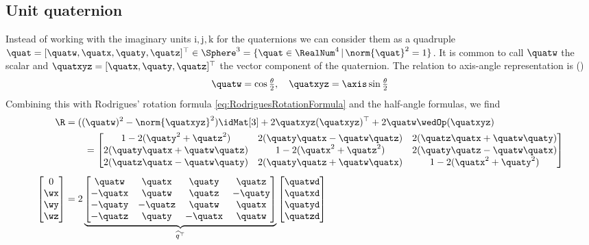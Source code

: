 \subsection{Unit quaternion}
Instead of working with the imaginary units $\mathrm{i}, \mathrm{j}, \mathrm{k}$ for the quaternions we can consider them as a quadruple $\quat = [\quatw, \quatx, \quaty, \quatz]^\top \in \Sphere^3 = \{ \quat \in \RealNum^4 \, | \, \norm{\quat}^2 = 1 \}$.
It is common to call $\quatw$ the scalar and $\quatxyz=[\quatx, \quaty, \quatz]^\top$ the vector component of the quaternion.
The relation to axis-angle representation is (\eg \cite[sec.\ 2.3]{Murray:Robotic})
\begin{align}
 \quatw = \cos\tfrac{\theta}{2}, \quad \quatxyz = \axis \sin\tfrac{\theta}{2}
\end{align}
Combining this with Rodrigues' rotation formula \eqref{eq:RodriguesRotationFormula} and the half-angle formulas, we find
\begin{align}
 \R &= ((\quatw)^2 - \norm{\quatxyz}^2) \idMat[3] + 2 \quatxyz (\quatxyz)^\top + 2 \quatw \wedOp(\quatxyz)
\nonumber\\
 &\qquad=
 \begin{bmatrix} 
  1 - 2(\quaty^{2} + \quatz^{2}) & 2(\quaty\quatx -\quatw\quatz)  & 2(\quatz\quatx + \quatw\quaty) \\
  2(\quaty\quatx + \quatw\quatz) & 1 - 2(\quatx^{2} + \quatz^{2}) & 2(\quaty\quatz - \quatw\quatx) \\
  2(\quatz\quatx - \quatw\quaty) & 2(\quaty\quatz + \quatw\quatx) & 1 - 2(\quatx^{2} + \quaty^{2})
 \end{bmatrix}
\\[1ex]
 \begin{bmatrix} 0 \\ \wx \\ \wy \\ \wz \end{bmatrix}
 &=
 2 \underbrace{\begin{bmatrix}
   \quatw &  \quatx &  \quaty &  \quatz \\
  -\quatx &  \quatw &  \quatz & -\quaty \\
  -\quaty & -\quatz &  \quatw &  \quatx \\
  -\quatz &  \quaty & -\quatx &  \quatw
 \end{bmatrix}}_{\widehat{q}^\top}
 \begin{bmatrix} \quatwd \\ \quatxd \\ \quatyd \\ \quatzd \end{bmatrix}
\end{align}
